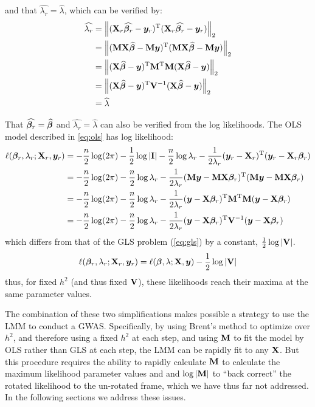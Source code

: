 and that $\widehat{\lambda_r} = \widehat{\lambda}$, which can be verified by:
\begin{align}
  \widehat{\lambda_r}   &= \left\lVert(\mathbf{X}_r \widehat{\boldsymbol{\beta}_r} - \bm{y}_r)^\mathrm{T}(\mathbf{X}_r \widehat{\boldsymbol{\beta}_r} - \bm{y}_r)\right\rVert_{2}\\
                        &= \left\lVert(\mathbf{M} \mathbf{X} \widehat{\boldsymbol{\beta}} - \mathbf{M} \bm{y})^\mathrm{T}(\mathbf{M} \mathbf{X} \widehat{\boldsymbol{\beta}} - \mathbf{M} \bm{y})\right\rVert_{2}\\
                        &= \left\lVert(\mathbf{X} \widehat{\boldsymbol{\beta}} - \bm{y})^\mathrm{T}\mathbf{M}^\mathrm{T}\mathbf{M}(\mathbf{X} \widehat{\boldsymbol{\beta}} - \bm{y})\right\rVert_{2}\\
                        &= \left\lVert(\mathbf{X} \widehat{\boldsymbol{\beta}} - \bm{y})^\mathrm{T}\mathbf{V}^{-1}(\mathbf{X} \widehat{\boldsymbol{\beta}} - \bm{y})\right\rVert_{2}\\
                        &= \widehat{\lambda}
\end{align}

That $\widehat{\boldsymbol{\beta}_r} = \widehat{\boldsymbol{\beta}}$ and $\widehat{\lambda_r} = \widehat{\lambda}$ can also be verified from the log likelihoods.
The OLS model described in \cref{eq:ols} has log likelihood:
\begin{align}
    \ell(\boldsymbol{\beta}_r, \lambda_r; \mathbf{X}_r, \bm{y}_r) 
    &=    -\frac{n}{2}\log(2\pi)
          -\frac{1}{2}\log|\mathbf{I}|
          -\frac{n}{2}\log\lambda_r
          -\frac{1}{2\lambda_r}
          (\bm{y}_r - \mathbf{X}_r)^\mathrm{T} (\bm{y}_r - \mathbf{X}_r\boldsymbol{\beta}_r)\\
    & =
          -\frac{n}{2}\log(2\pi)
          -\frac{n}{2}\log\lambda_r
          -\frac{1}{2\lambda_r}
          (\mathbf{M}\bm{y} - \mathbf{M}\mathbf{X}\boldsymbol{\beta}_r)^\mathrm{T} (\mathbf{M}\bm{y} - \mathbf{M}\mathbf{X}\boldsymbol{\beta}_r)\\
    &=    -\frac{n}{2}\log(2\pi)
          -\frac{n}{2}\log\lambda_r
          -\frac{1}{2\lambda_r}
          (\bm{y} - \mathbf{X}\boldsymbol{\beta}_r)^\mathrm{T} \mathbf{M}^\mathrm{T} \mathbf{M} (\bm{y} - \mathbf{X}\boldsymbol{\beta}_r)\\
    &=    -\frac{n}{2}\log(2\pi)
          -\frac{n}{2}\log\lambda_r
          -\frac{1}{2\lambda_r}
          (\bm{y}-\mathbf{X}\boldsymbol{\beta}_r)^\mathrm{T} \mathbf{V}^{-1} (\bm{y}-\mathbf{X}\boldsymbol{\beta}_r)
\end{align}
which differs from that of the GLS problem (\cref{eq:gls}) by a constant, $\frac{1}{2}\log|\mathbf{V}|$.
\begin{align}
  \ell(\boldsymbol{\beta}_r, \lambda_r; \mathbf{X}_r, \bm{y}_r) = \ell(\boldsymbol{\beta}, \lambda; \mathbf{X}, \bm{y}) -\frac{1}{2}\log|\mathbf{V}|
\end{align}
thus, for fixed $h^2$ (and thus fixed $\mathbf{V}$), these likelihoods reach their maxima at the same parameter values.

The combination of these two simplifications makes possible a strategy to use the LMM to conduct a GWAS.
Specifically, by using Brent's method to optimize over $h^2$, and therefore using a fixed $h^2$ at each step, and using $\mathbf{M}$ to fit the model by OLS rather than GLS at each step, the LMM can be rapidly fit to any $\mathbf{X}$.
But this procedure requires the ability to rapidly calculate $\mathbf{M}$ to calculate the maximum likelihood parameter values and and $\log \left| \mathbf{M} \right|$ to ``back correct'' the rotated likelihood to the un-rotated frame, which we have thus far not addressed.
In the following sections we address these issues.

